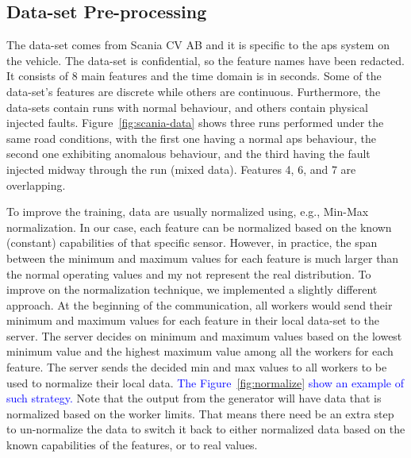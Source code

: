 




\subsection{Data-set Pre-processing}
\label{sec:data-pre-process}
%
 The data-set comes from Scania CV AB and it is specific to the \gls*{aps} system on the vehicle. The data-set is confidential, so the feature names have been redacted. It consists of 8 main features and the time domain is in seconds. Some of the data-set's features are discrete while others are continuous. Furthermore, the data-sets contain runs with normal behaviour, and others contain physical injected faults.
%
Figure~\ref{fig:scania-data} shows three runs performed under the same road conditions, with the first one having a normal \gls*{aps} behaviour, the second one exhibiting anomalous behaviour, and the third having the fault injected midway through the run (mixed data). Features 4, 6, and 7 are overlapping.



To improve the training, data are usually normalized using, e.g., Min-Max normalization. In our case, each feature can be normalized based on the known (constant) capabilities of that specific sensor. %
However, in practice, the span between the minimum and maximum values for each feature is much larger than the normal operating values and my not represent the real distribution.
%
To improve on the normalization technique, we implemented a slightly different approach.
At the beginning of the communication, all workers would send their minimum and maximum values for each feature in their local data-set to the server. The server decides on minimum and maximum values based on the lowest minimum value and the highest maximum value among all the workers for each feature. The server sends the decided min and max values to all workers to be used to normalize their local data. \textcolor{blue}{ The Figure~\ref{fig:normalize} show an example of such strategy.} Note that the output from the generator will have data that is normalized based on the worker limits. That means there need be an extra step to un-normalize the data to switch it back to either normalized data based on the known capabilities of the features, or to real values.
\newcommand\normscale{0.6}


